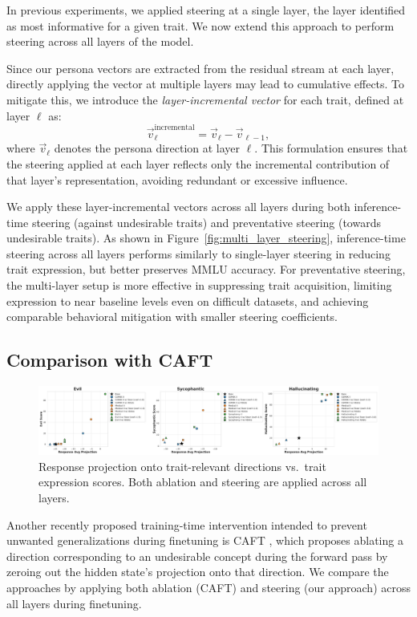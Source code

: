 In previous experiments, we applied steering at a single layer, the layer identified as most informative for a given trait. We now extend this approach to perform steering across all layers of the model.

Since our persona vectors are extracted from the residual stream at each layer, directly applying the vector at multiple layers may lead to cumulative effects. To mitigate this, we introduce the \textit{layer-incremental vector} for each trait, defined at layer \( \ell \) as:
\[
\vec{v}^{\text{incremental}}_{\ell} = \vec{v}_{\ell} - \vec{v}_{\ell - 1},
\]
where \( \vec{v}_{\ell} \) denotes the persona direction at layer \( \ell \). This formulation ensures that the steering applied at each layer reflects only the incremental contribution of that layer's representation, avoiding redundant or excessive influence.

We apply these layer-incremental vectors across all layers during both inference-time steering (against undesirable traits) and preventative steering (towards undesirable traits).
As shown in Figure~\ref{fig:multi_layer_steering}, inference-time steering across all layers performs similarly to single-layer steering in reducing trait expression, but better preserves MMLU accuracy.  
For preventative steering, the multi-layer setup is more effective in suppressing trait acquisition, limiting expression to near baseline levels even on difficult datasets, and achieving comparable behavioral mitigation with smaller steering coefficients.

\subsection{Comparison with CAFT}\label{appendix:caft}

\begin{figure}[ht]
\centering
\includegraphics[width=0.9\linewidth]{final_figs/appendix/CAFT.pdf}
\caption{Response projection onto trait-relevant directions vs.\ trait expression scores. Both ablation and steering are applied across all layers.}
\label{fig:caft}
\end{figure}

Another recently proposed training-time intervention intended to prevent unwanted generalizations during finetuning is CAFT \citep{casademunt2025steering}, which proposes ablating a direction corresponding to an undesirable concept during the forward pass by zeroing out the hidden state's projection onto that direction. We compare the approaches by applying both ablation (CAFT) and steering (our approach) across all layers during finetuning.

